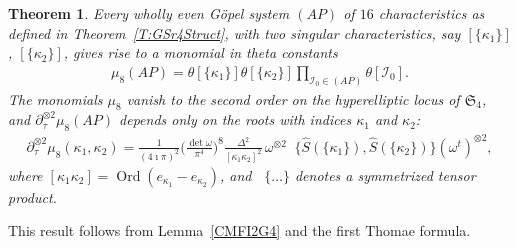 \documentclass[twoside]{amsart}
\newcommand{\I}{\mathcal{I}}
\DeclareMathOperator{\Ord}{Ord}
\DeclareMathOperator{\SymOtimes}{\overset{\mathrm{sym}}{\otimes}}
\newtheorem{theo}{Theorem}[section]
\theoremstyle{definition}
\theoremstyle{plain}
\begin{document}
\begin{theo}
Every wholly even G\"{o}pel system $(AP)$ of $16$ characteristics 
as defined in Theorem~\ref{T:GSr4Struct},
with two singular characteristics, say $[\{\kappa_1\}]$, $[\{\kappa_2\}]$,
gives rise to a monomial in theta constants
\begin{gather}\label{Mu8G4}
\mu_8 (AP) = \theta[\{\kappa_1\}]  \theta[\{\kappa_2\}] \prod_{\I_0 \in (AP)} \theta[\I_0]. 
\end{gather}
The monomials $\mu_8$ vanish to the second order on the hyperelliptic locus of $\mathfrak{S}_4$,  
and  $\partial^{\otimes 2}_\tau \mu_8(AP)$ depends only on the roots with indices $\kappa_1$ and $\kappa_2$:
\begin{gather}\label{DMu8G4}
\partial_\tau^{\otimes 2} \mu_8 (\kappa_1,\kappa_2) =
\frac{1}{(4\imath \pi)^2} \Big(\frac{\det \omega}{\pi^4}\Big)^{8} 
\frac{\Delta^2}{[\kappa_1\kappa_2]^2} \, \omega^{\otimes 2} 
\SymOtimes \big\{\hat{S}(\{\kappa_1\}), \hat{S}(\{\kappa_2\})\big\} (\omega^t)^{\otimes 2},
\end{gather}
where $[\kappa_1\kappa_2]=\Ord(e_{\kappa_1}-e_{\kappa_2})$, and 
$\SymOtimes \big\{ \dots \big\}$ 
denotes a symmetrized tensor product.
\end{theo}
This result follows from Lemma~\ref{CMFI2G4} and the first Thomae formula.
\end{document}
